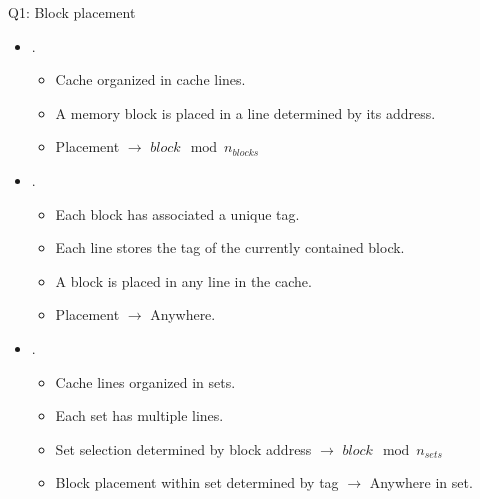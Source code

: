\begin{frame}[t,shrink=10]{Q1: Block placement}
\begin{itemize}
  \item {}.
    \begin{itemize}
      \item Cache organized in cache lines.
      \item A memory block is placed in a line determined by its address.
      \item Placement $\rightarrow$ $block \mod n_{blocks}$
    \end{itemize}

  \item {}.
    \begin{itemize}
      \item Each block has associated a unique tag.
      \item Each line stores the tag of the currently contained block.
      \item A block is placed in any line in the cache.
      \item Placement $\rightarrow$ Anywhere.
    \end{itemize}

  \item {}.
    \begin{itemize}
      \item Cache lines organized in sets.
      \item Each set has multiple lines.
      \item Set selection determined by block address 
            $\rightarrow$ $block \mod n_{sets}$
      \item Block placement within set determined by tag 
            $\rightarrow$ Anywhere in set.
    \end{itemize}
\end{itemize}
\end{frame}

